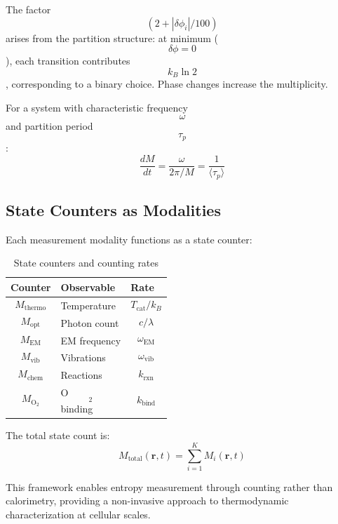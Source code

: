 \documentclass[twocolumn,10pt]{article}
\begin{document}
The factor $$(2 + |\delta\phi_i|/100)$$ arises from the partition structure: at minimum ($$\delta\phi = 0$$), each transition contributes $$k_B \ln 2$$, corresponding to a binary choice. Phase changes increase the multiplicity.

For a system with characteristic frequency $$\omega$$ and partition period $$\tau_p$$:
\begin{equation}
\frac{dM}{dt} = \frac{\omega}{2\pi/M} = \frac{1}{\langle \tau_p \rangle}
\end{equation}

\subsection{State Counters as Modalities}

Each measurement modality functions as a state counter:

\begin{table}[H]
\centering
\caption{State counters and counting rates}
\begin{tabular}{@{}lll@{}}
\toprule
Counter & Observable & Rate \\
\midrule
$$M_{\text{thermo}}$$ & Temperature & $$T_{\text{cat}}/k_B$$ \\
$$M_{\text{opt}}$$ & Photon count & $$c/\lambda$$ \\
$$M_{\text{EM}}$$ & EM frequency & $$\omega_{\text{EM}}$$ \\
$$M_{\text{vib}}$$ & Vibrations & $$\omega_{\text{vib}}$$ \\
$$M_{\text{chem}}$$ & Reactions & $$k_{\text{rxn}}$$ \\
$$M_{\text{O}_2}$$ & O$$_2$$ binding & $$k_{\text{bind}}$$ \\
\bottomrule
\end{tabular}
\end{table}

The total state count is:
\begin{equation}
M_{\text{total}}(\mathbf{r}, t) = \sum_{i=1}^{K} M_i(\mathbf{r}, t)
\end{equation}

This framework enables entropy measurement through counting rather than calorimetry, providing a non-invasive approach to thermodynamic characterization at cellular scales.
\end{document}
